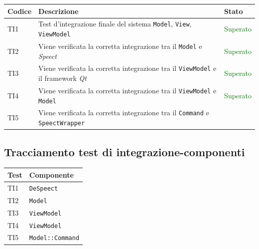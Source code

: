 \documentclass[openany,12pt,a4paper]{report}
\begin{document}
\setlength\LTleft{6mm}
\begin{longtable}{| p{2.5cm} |p{5cm} | p{2.5cm} |}
	\hline
	\textbf{Codice} & \textbf{Descrizione} & \textbf{Stato}\\
	\hline
	\endhead
	\newline TI1&
	\newline Test d'integrazione finale del sistema \verb|Model|, \verb|View|, \verb|ViewModel|&
	\newline \textcolor{green}{Superato}
	\\[1em]
	\hline
	\newline TI2&
	\newline Viene verificata la corretta integrazione tra il  \verb|Model| e \textit{Speect}&
	\newline \textcolor{green}{Superato}
	\\[1em]
	\hline
	\newline TI3&
	\newline Viene verificata la corretta integrazione tra il  \verb|ViewModel| e il framework \textit{Qt}&
	\newline \textcolor{green}{Superato} 
	\\[1em]
	\hline
	\newline TI4&
	\newline Viene verificata la corretta integrazione tra il  \verb|ViewModel| e \verb|Model|&
	\newline \textcolor{green}{Superato}
	\\[1em]
	\hline
	\newline TI5&
	\newline Viene verificata la corretta integrazione tra il  \verb|Command| e \verb|SpeectWrapper|&
	\newline \color{green}{Superato}
	\\[1em]
	\hline
\end{longtable}

\subsection{Tracciamento test di integrazione-componenti}

\begin{longtable}{| p{3cm} |p{6cm}|}
	\hline
	\textbf{Test} & \textbf{Componente}\\
	\hline
	\endhead
	TI1&\verb|DeSpeect|
	\\[1em]	
	\hline	
	TI2&\verb|Model|
	\\[1em]	
	\hline	
	TI3&\verb|ViewModel|
	\\[1em]	
	\hline	
	TI4&\verb|ViewModel|
	\\[1em]	
	\hline	
	TI5&\verb|Model::Command|
	\\[1em]
	\hline
\end{longtable}
\end{document}
